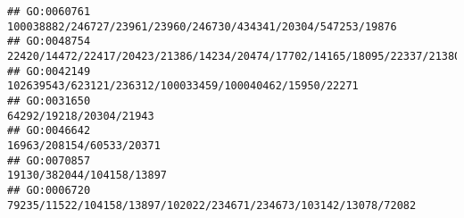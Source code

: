 \documentclass[
]{article}
\begin{document}
\begin{verbatim}
## GO:0060761                                                                                                                                                                                                                                                                                                                                                100038882/246727/23961/23960/246730/434341/20304/547253/19876
## GO:0048754                                                                                                                                                                                                                                                                                                                         22420/14472/22417/20423/21386/14234/20474/17702/14165/18095/22337/21380/104156/12705
## GO:0042149                                                                                                                                                                                                                                                                                                                                                      102639543/623121/236312/100033459/100040462/15950/22271
## GO:0031650                                                                                                                                                                                                                                                                                                                                                                                      64292/19218/20304/21943
## GO:0046642                                                                                                                                                                                                                                                                                                                                                                                     16963/208154/60533/20371
## GO:0070857                                                                                                                                                                                                                                                                                                                                                                                    19130/382044/104158/13897
## GO:0006720                                                                                                                                                                                                                                                                                                                                             79235/11522/104158/13897/102022/234671/234673/103142/13078/72082

\end{verbatim}
\end{document}
